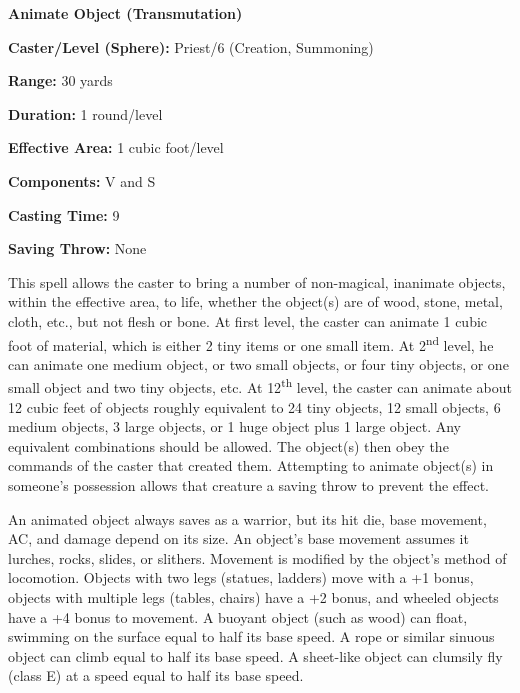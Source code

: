 \begin{multicols}{2}
\vspace{1em}

\noindent
\begin{minipage}{\columnwidth}

\noindent \textbf{Animate Object (Transmutation)}

\noindent \textbf{Caster/Level (Sphere):} Priest/6 (Creation, Summoning)

\noindent \textbf{Range:} 30 yards

\noindent \textbf{Duration:} 1 round/level

\noindent \textbf{Effective Area:} 1 cubic foot/level

\noindent \textbf{Components:} V and S

\noindent \textbf{Casting Time:} 9

\noindent \textbf{Saving Throw:} None

\end{minipage}

This spell allows the caster to bring a number of non-magical, inanimate objects, within the effective area, to life, whether the object(s) are of wood, stone, metal, cloth, etc., but not flesh or bone.  At first level, the caster can animate 1 cubic foot of material, which is either 2 tiny items or one small item.  At 2\textsuperscript{nd} level, he can animate one medium object, or two small objects, or four tiny objects, or one small object and two tiny objects, etc.  At 12\textsuperscript{th} level, the caster can animate about 12 cubic feet of objects roughly equivalent to 24 tiny objects, 12 small objects, 6 medium objects, 3 large objects, or 1 huge object plus 1 large object.  Any equivalent combinations should be allowed.  The object(s) then obey the commands of the caster that created them.  Attempting to animate object(s) in someone's possession allows that creature a saving throw to prevent the effect.
  
An animated object always saves as a warrior, but its hit die, base movement, AC, and damage depend on its size.  An object's base movement assumes it lurches, rocks, slides, or slithers.  Movement is modified by the object's method of locomotion.  Objects with two legs (statues, ladders) move with a +1 bonus, objects with multiple legs (tables, chairs) have a +2 bonus, and wheeled objects have a +4 bonus to movement.  A buoyant object (such as wood) can float, swimming on the surface equal to half its base speed.  A rope or similar sinuous object can climb equal to half its base speed.  A sheet-like object can clumsily fly (class E) at a speed equal to half its base speed.


\end{multicols}
